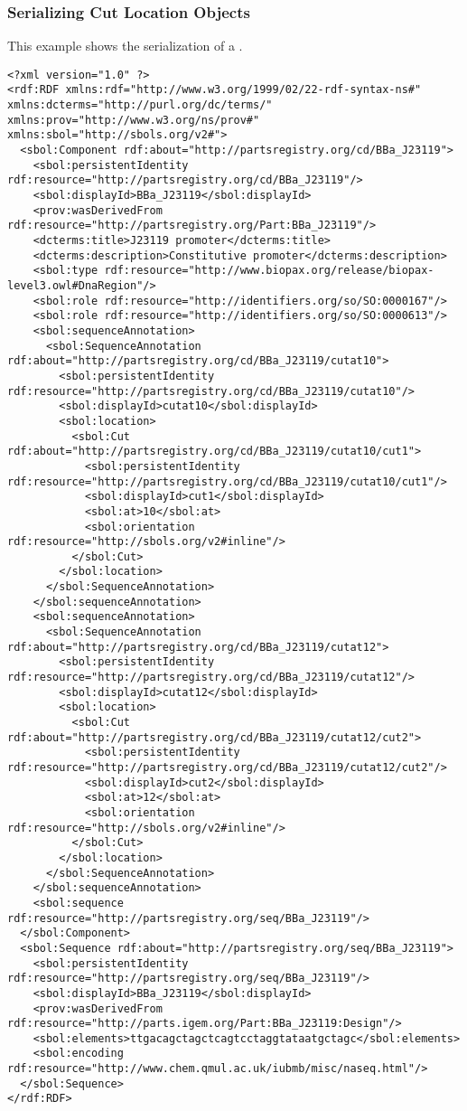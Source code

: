 \subsubsection{Serializing Cut Location Objects}
This example shows the serialization of a  .
\begin{lstlisting}
<?xml version="1.0" ?>
<rdf:RDF xmlns:rdf="http://www.w3.org/1999/02/22-rdf-syntax-ns#" xmlns:dcterms="http://purl.org/dc/terms/" xmlns:prov="http://www.w3.org/ns/prov#" xmlns:sbol="http://sbols.org/v2#">
  <sbol:Component rdf:about="http://partsregistry.org/cd/BBa_J23119">
    <sbol:persistentIdentity rdf:resource="http://partsregistry.org/cd/BBa_J23119"/>
    <sbol:displayId>BBa_J23119</sbol:displayId>
    <prov:wasDerivedFrom rdf:resource="http://partsregistry.org/Part:BBa_J23119"/>
    <dcterms:title>J23119 promoter</dcterms:title>
    <dcterms:description>Constitutive promoter</dcterms:description>
    <sbol:type rdf:resource="http://www.biopax.org/release/biopax-level3.owl#DnaRegion"/>
    <sbol:role rdf:resource="http://identifiers.org/so/SO:0000167"/>
    <sbol:role rdf:resource="http://identifiers.org/so/SO:0000613"/>
    <sbol:sequenceAnnotation>
      <sbol:SequenceAnnotation rdf:about="http://partsregistry.org/cd/BBa_J23119/cutat10">
        <sbol:persistentIdentity rdf:resource="http://partsregistry.org/cd/BBa_J23119/cutat10"/>
        <sbol:displayId>cutat10</sbol:displayId>
        <sbol:location>
          <sbol:Cut rdf:about="http://partsregistry.org/cd/BBa_J23119/cutat10/cut1">
            <sbol:persistentIdentity rdf:resource="http://partsregistry.org/cd/BBa_J23119/cutat10/cut1"/>
            <sbol:displayId>cut1</sbol:displayId>
            <sbol:at>10</sbol:at>
            <sbol:orientation rdf:resource="http://sbols.org/v2#inline"/>
          </sbol:Cut>
        </sbol:location>
      </sbol:SequenceAnnotation>
    </sbol:sequenceAnnotation>
    <sbol:sequenceAnnotation>
      <sbol:SequenceAnnotation rdf:about="http://partsregistry.org/cd/BBa_J23119/cutat12">
        <sbol:persistentIdentity rdf:resource="http://partsregistry.org/cd/BBa_J23119/cutat12"/>
        <sbol:displayId>cutat12</sbol:displayId>
        <sbol:location>
          <sbol:Cut rdf:about="http://partsregistry.org/cd/BBa_J23119/cutat12/cut2">
            <sbol:persistentIdentity rdf:resource="http://partsregistry.org/cd/BBa_J23119/cutat12/cut2"/>
            <sbol:displayId>cut2</sbol:displayId>
            <sbol:at>12</sbol:at>
            <sbol:orientation rdf:resource="http://sbols.org/v2#inline"/>
          </sbol:Cut>
        </sbol:location>
      </sbol:SequenceAnnotation>
    </sbol:sequenceAnnotation>
    <sbol:sequence rdf:resource="http://partsregistry.org/seq/BBa_J23119"/>
  </sbol:Component>
  <sbol:Sequence rdf:about="http://partsregistry.org/seq/BBa_J23119">
    <sbol:persistentIdentity rdf:resource="http://partsregistry.org/seq/BBa_J23119"/>
    <sbol:displayId>BBa_J23119</sbol:displayId>
    <prov:wasDerivedFrom rdf:resource="http://parts.igem.org/Part:BBa_J23119:Design"/>
    <sbol:elements>ttgacagctagctcagtcctaggtataatgctagc</sbol:elements>
    <sbol:encoding rdf:resource="http://www.chem.qmul.ac.uk/iubmb/misc/naseq.html"/>
  </sbol:Sequence>
</rdf:RDF>
\end{lstlisting}


